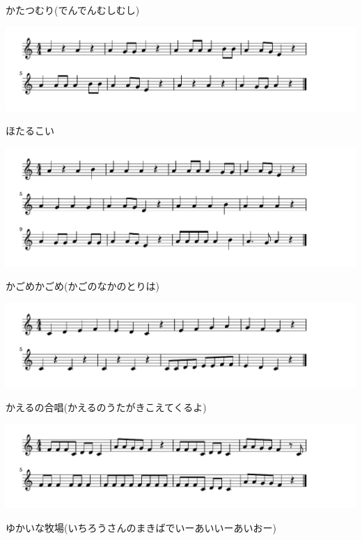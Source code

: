 \documentclass[a4paper]{ltjsarticle}
\begin{document}
\vspace{-10mm} \hspace{10mm}
かたつむり(でんでんむしむし)

\includegraphics[clip]{hotarukoi_crop.pdf}

\vspace{-10mm} \hspace{10mm}
ほたるこい

\includegraphics[clip]{kagome_crop.pdf}

\vspace{-10mm} \hspace{10mm}
かごめかごめ(かごのなかのとりは)

\includegraphics[clip]{kaerunogassho_crop.pdf}

\vspace{-10mm} \hspace{10mm}
かえるの合唱(かえるのうたがきこえてくるよ)

\includegraphics[clip]{yukainamakiba_crop.pdf}

\vspace{-10mm} \hspace{10mm}
ゆかいな牧場(いちろうさんのまきばでいーあいいーあいおー)
\end{document}
